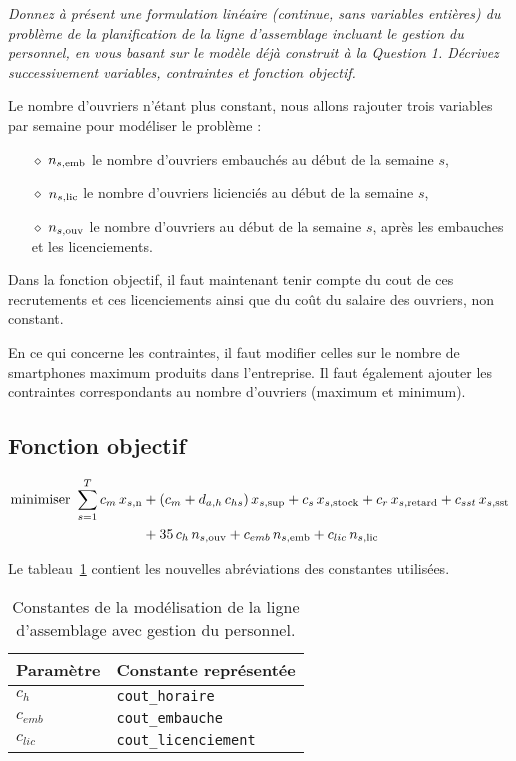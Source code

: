 \question %
\emph{Donnez à présent une formulation linéaire (continue, sans variables
entières) du problème de la planification de la ligne d'assemblage
incluant le gestion du personnel, en vous basant sur le modèle déjà 
construit à la Question 1. Décrivez successivement variables, 
contraintes et fonction objectif.}

Le nombre d'ouvriers n'étant plus constant, nous allons rajouter trois variables
par semaine pour modéliser le problème :
\begin{itemize}
  \item[$\diamond$] $n_{s,\text{emb}}$ le nombre d'ouvriers embauchés au début de la semaine $s$,
  \item[$\diamond$] $n_{s,\text{lic}}$ le nombre d'ouvriers licienciés au début de la semaine $s$,
  \item[$\diamond$] $n_{s,\text{ouv}}$ le nombre d'ouvriers au début de la semaine $s$,
  après les embauches et les licenciements.
\end{itemize}

Dans la fonction objectif, il faut maintenant tenir compte du cout de 
ces recrutements et ces licenciements 
ainsi que du coût du salaire des ouvriers, non constant.

En ce qui concerne les contraintes, il faut modifier celles sur 
le nombre de smartphones maximum produits dans l'entreprise. 
Il faut également ajouter les contraintes correspondants 
au nombre d'ouvriers (maximum et minimum).

\subsection*{Fonction objectif}
\begin{align*}
  \mbox{minimiser } 
  \sum_{s=1}^{T} 
  c_m\, x_{s,\text{n}} &+ (c_m + d_{a,h} \, c_{hs})\, x_{s,\text{sup}}
  + c_s\, x_{s,\text{stock}} + c_r\, x_{s,\text{retard}} + c_{sst}\, x_{s,\text{sst}} \\
  &+ 35 \, c_{h} \, n_{s,\text{ouv}} 
  + c_{emb} \, n_{s,\text{emb}} + c_{lic} \, n_{s,\text{lic}}
\end{align*}

Le tableau~\ref{tab:constantesQuestion7} contient les nouvelles abréviations
des constantes utilisées.
\begin{table}[h]
  \begin{center}
  \begin{tabular}{|l|l|}
    \hline
    Paramètre & Constante représentée \\
    \hline
    \hline
    $c_{h}$ & \texttt{cout\_horaire} \\
    \hline
    $c_{emb}$ & \texttt{cout\_embauche} \\
    \hline
    $c_{lic}$ & \texttt{cout\_licenciement} \\
    \hline
  \end{tabular}
  \caption{Constantes de la modélisation de la ligne d'assemblage
  avec gestion du personnel.}
  \label{tab:constantesQuestion7}
  \end{center}
\end{table}

